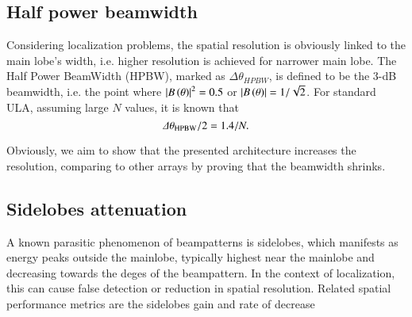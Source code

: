 \subsection{Half power beamwidth}
Considering localization problems, the spatial resolution is obviously linked to the main lobe's width, i.e. higher resolution is achieved for narrower main lobe.
The Half Power BeamWidth (HPBW), marked as $\Delta\theta_{HPBW}$, is defined to be the 3-dB beamwidth, i.e. the point where $\left\vert B\left({\theta}\right)\right\vert^{2} = 0.5$ or $\left\vert B\left({\theta}\right)\right\vert = 1/\sqrt{2}$.
For standard ULA, assuming large $N$ values, it is known \cite{van2004optimum} that
\begin{equation}
    \label{eq_known_HBPW}
    \Delta\theta_{\text{HPBW}}/2= 1.4/N.
\end{equation}
\par
Obviously, we aim to show that the presented architecture increases the resolution, comparing to other arrays by proving that the beamwidth shrinks.
%
%
%
\subsection{Sidelobes attenuation}
A known \cite{van2004optimum} parasitic phenomenon of beampatterns is sidelobes, which manifests as energy peaks outside the mainlobe, typically highest near the mainlobe and decreasing towards the deges of the beampattern.
In the context of localization, this can cause false detection or reduction in spatial resolution.
Related spatial performance metrics are the sidelobes gain and rate of decrease
%
%
%
